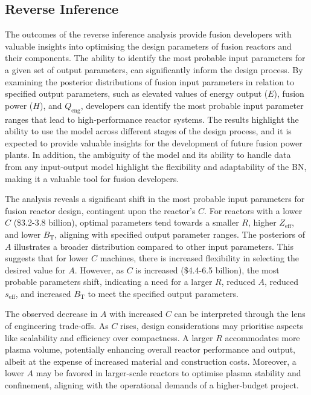\documentclass[journal]{IEEEtran}
\begin{document}

\subsection{Reverse Inference}\label{sec:disc_reverse}

The outcomes of the reverse inference analysis provide fusion developers with valuable insights into optimising the design parameters of fusion reactors and their components. The ability to identify the most probable input parameters for a given set of output parameters, can significantly inform the design process. By examining the posterior distributions of fusion input parameters in relation to specified output parameters, such as elevated values of energy output ($E$), fusion power ($H$), and $Q_{\text{eng}}$, developers can identify the most probable input parameter ranges that lead to high-performance reactor systems. The results highlight the ability to use the model across different stages of the design process, and it is expected to provide valuable insights for the development of future fusion power plants. In addition, the ambiguity of the model and its ability to handle data from any input-output model highlight the flexibility and adaptability of the BN, making it a valuable tool for fusion developers.

The analysis reveals a significant shift in the most probable input parameters for fusion reactor design, contingent upon the reactor's $C$. For reactors with a lower $C$ (\$3.2-3.8 billion), optimal parameters tend towards a smaller $R$, higher $Z_{\text{eff}}$, and lower $B_{\text{T}}$, aligning with specified output parameter ranges. The posteriors of $A$ illustrates a broader distribution compared to other input parameters. This suggests that for lower $C$ machines, there is increased flexibility in selecting the desired value for $A$. However, as $C$ is increased (\$4.4-6.5 billion), the most probable parameters shift, indicating a need for a larger $R$, reduced $A$, reduced $s_{\text{eff}}$, and increased $B_{\text{T}}$ to meet the specified output parameters.

The observed decrease in $A$ with increased $C$ can be interpreted through the lens of engineering trade-offs. As $C$ rises, design considerations may prioritise aspects like scalability and efficiency over compactness. A larger $R$ accommodates more plasma volume, potentially enhancing overall reactor performance and output, albeit at the expense of increased material and construction costs. Moreover, a lower $A$ may be favored in larger-scale reactors to optimise plasma stability and confinement, aligning with the operational demands of a higher-budget project. 
\end{document}

